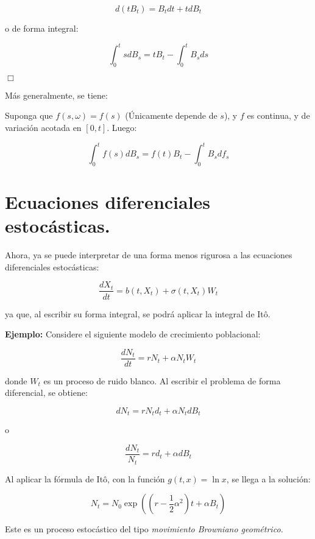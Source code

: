\[
	d(tB_t) = B_t dt + tdB_t
\]

o de forma integral:

\[
	\int_0^t s dB_s = tB_t - \int_0^t B_s ds
\]

\begin{flushright}
	$\Box$
\end{flushright}

Más generalmente, se tiene:

\begin{theorem}
	Suponga que $f(s,\omega) = f(s)$ (Únicamente depende de $s$), y $f$ es continua, y de variación acotada en $[0,t]$. Luego:

	\[
		\int_0^t f(s) dB_s = f(t) B_t - \int_0^t B_s df_s
	\]
\end{theorem}




\section{Ecuaciones diferenciales estocásticas.}

Ahora, ya se puede interpretar de una forma menos rigurosa a las ecuaciones diferenciales estocásticas:

\[
	\frac{dX_t}{dt} = b(t, X_t) + \sigma(t, X_t) W_t
\]

ya que, al escribir su forma integral, se podrá aplicar la integral de Itô.

\textbf{Ejemplo:} Considere el siguiente modelo de crecimiento poblacional:

\[
	\frac{dN_t}{dt} = r N_t + \alpha N_t W_t
\]

donde $W_t$ es un proceso de ruido blanco. Al escribir el problema de forma diferencial, se obtiene:

\[
	dN_t = r N_t d_t + \alpha N_t dB_t
\]

o

\[
	\frac{dN_t}{N_t} = r d_t + \alpha dB_t
\]

Al aplicar la fórmula de Itô, con la función $g(t,x)=\ln x$, se llega a la solución:

\[
	N_t = N_0 \exp \left( \left(r - \frac{1}{2} \alpha^2 \right)t +\alpha B_t  \right)
\]

Este es un proceso estocástico del tipo \textit{movimiento Browniano geométrico.}

